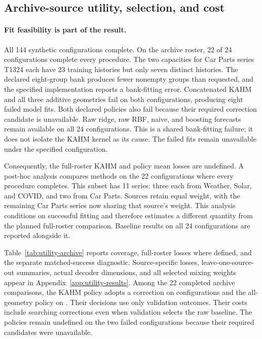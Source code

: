 \subsection{Archive-source utility, selection, and cost}
\label{sec:utility-archive-results}

\paragraph{Fit feasibility is part of the result.}
All 144 synthetic configurations complete. On the archive roster, 22 of
24 configurations complete every procedure. The two capacities for Car
Parts series T1324 each have 23 training histories but only seven distinct
histories. The declared eight-group bank produces fewer nonempty groups
than requested, and the specified implementation reports a bank-fitting error. Concatenated KAHM and all three additive
geometries fail on both configurations, producing eight failed model fits.
Both declared policies also fail because their required correction
candidate is unavailable. Raw ridge, raw RBF, naive, and boosting forecasts
remain available on all 24 configurations. This is a shared bank-fitting
failure; it does not isolate the KAHM kernel as its cause. The failed fits remain unavailable under the specified configuration.

Consequently, the full-roster KAHM and policy mean losses are undefined.
A post-hoc analysis compares methods on the 22 configurations where every
procedure completes. This subset has 11 series: three each from Weather,
Solar, and COVID, and two from Car Parts. Sources retain equal weight,
with the remaining Car Parts series now sharing that source's weight.
This analysis conditions on successful fitting and therefore estimates
a different quantity from the planned full-roster comparison. Baseline
results on all 24 configurations are reported alongside it.



Table~\ref{tab:utility-archive} reports coverage, full-roster losses where
defined, and the separate matched-success diagnostic. Source-specific
losses, leave-one-source-out summaries, actual decoder dimensions, and
all selected mixing weights appear in Appendix~\ref{app:utility-results}.
Among the 22 completed archive comparisons, the KAHM policy adopts a
correction on \UtilityKAHMAdoptions{} configurations and the all-geometry
policy on \UtilityGeometryAdoptions{}. Their decisions use only validation
outcomes. Their costs include searching corrections even when validation selects
the raw baseline. The policies remain undefined on the two failed
configurations because their required candidates were unavailable.


